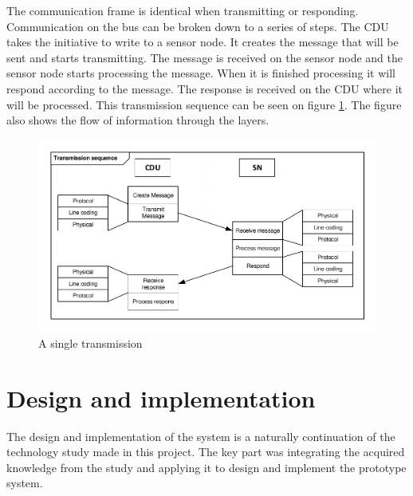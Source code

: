 The communication frame is identical when transmitting or responding. Communication on the bus can be broken down to a series of steps. The CDU takes the initiative to write to a sensor node. It creates the message that will be sent and starts transmitting. The message is received on the sensor node and the sensor node starts processing the message. When it is finished processing it will respond according to the message. The response is received on the CDU where it will be processed. This transmission sequence can be seen on figure \ref{fig:sintrans}. The figure also shows the flow of information through the layers. 
\begin{figure}[H]
\centering
\includegraphics[width=.8\textwidth]{billeder/11ProjectDescription/singletransmission}
\caption{A single transmission}
\label{fig:sintrans}
\end{figure}

\section{Design and implementation}
The design and implementation of the system is a naturally continuation of the technology study made in this project. The key part was integrating the acquired knowledge from the study and applying it to design and implement the prototype system.\\
